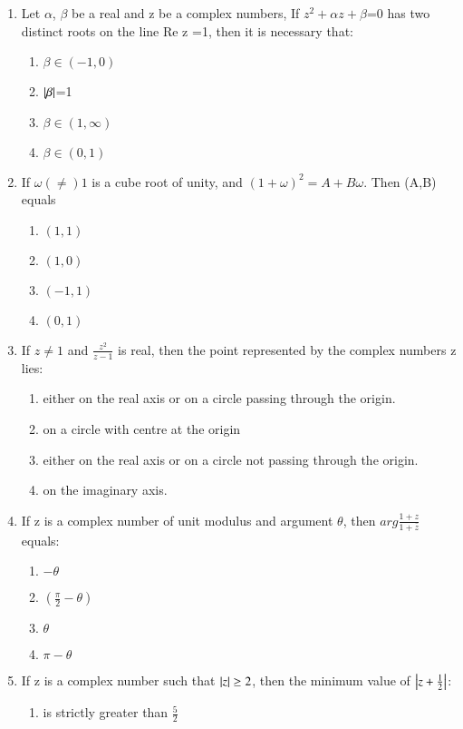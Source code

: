 \begin{enumerate}[label=\arabic*.,ref=\thesubsection.\theenumi]
    \item Let $\alpha$, $\beta$ be a real and z be a complex numbers, If $z^2+\alpha z +\beta$=0  has two distinct roots on the line Re z =1, then it is necessary that:
    \begin{enumerate}
    \item  $\beta \in (-1,0)$    
    \item  $\left\vert\beta\right\vert $=1    
    \item  $\beta \in (1,\infty)$
    \item  $\beta \in (0,1)$
    \end{enumerate}
    \item If $\omega(\neq)1$ is a cube root of unity, and $(1+\omega)^2 = A+B\omega$. Then (A,B) equals
    \begin{enumerate}
    \item  $(1,1)$    
    \item  $(1,0)$    
    \item  $(-1,1)$
    \item  $(0,1)$
    \end{enumerate}
    \item If $z \neq 1$ and $\frac{z^2}{z-1}$ is real, then the point represented by the complex numbers z lies:
    \begin{enumerate}
    \item  either on the real axis or on a circle passing through the origin.
    \item  on a circle with centre  at the origin    
    \item  either on the real axis or on a circle not passing through  the origin.
    \item  on the imaginary axis.
    \end{enumerate}
    \item If z is a complex number of unit modulus and argument $\theta$, then $arg\frac{1+z}{1+\bar z}$ equals:
    \begin{enumerate}
    \item  $-\theta$    
    \item  $(\frac{\pi}{2}-\theta)$    
    \item  $\theta$
    \item  $\pi-\theta$
    \end{enumerate}
    \item If z is a complex number such that $\left\vert z\right\vert \geq2$, then the minimum
    value of $\left\vert z+ \frac{1}{2}\right\vert$:
    \begin{enumerate}
    \item  is strictly greater than $\frac{5}{2}$    

\end{enumerate}
\end{enumerate}
